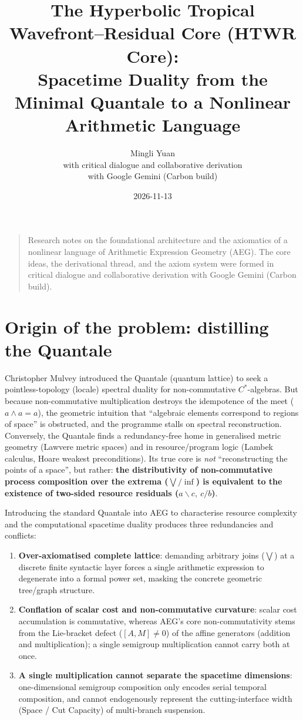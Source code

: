 \documentclass[11pt,a4paper]{article}
\title{\textbf{The Hyperbolic Tropical Wavefront--Residual Core (HTWR Core):}\\[0.3em]
Spacetime Duality from the Minimal Quantale to a Nonlinear Arithmetic Language}
\author{Mingli Yuan\\ \small with critical dialogue and collaborative derivation\\ \small with Google Gemini (Carbon build)}
\date{2026-11-13}
\theoremstyle{definition}
\theoremstyle{remark}
\begin{document}
\maketitle

\begin{quote}\small
Research notes on the foundational architecture and the axiomatics of a
nonlinear language of Arithmetic Expression Geometry (AEG).  The core ideas,
the derivational thread, and the axiom system were formed in critical dialogue
and collaborative derivation with Google Gemini (Carbon build).
\end{quote}

\section{Origin of the problem: distilling the Quantale}

Christopher Mulvey introduced the Quantale (quantum lattice) to seek a
pointless-topology (locale) spectral duality for non-commutative $C^*$-algebras.
But because non-commutative multiplication destroys the idempotence of the meet
($a \wedge a = a$), the geometric intuition that ``algebraic elements correspond
to regions of space'' is obstructed, and the programme stalls on spectral
reconstruction.  Conversely, the Quantale finds a redundancy-free home in
generalised metric geometry (Lawvere metric spaces) and in resource/program logic
(Lambek calculus, Hoare weakest preconditions).  Its true core is \emph{not}
``reconstructing the points of a space'', but rather: \textbf{the distributivity
of non-commutative process composition over the extrema ($\bigvee/\inf$) is
equivalent to the existence of two-sided resource residuals ($a \backslash c,\
c / b$)}.

Introducing the standard Quantale into AEG to characterise resource complexity
and the computational spacetime duality produces three redundancies and
conflicts:

\begin{enumerate}
\item \textbf{Over-axiomatised complete lattice}: demanding arbitrary joins
($\bigvee$) at a discrete finite syntactic layer forces a single arithmetic
expression to degenerate into a formal power set, masking the concrete geometric
tree/graph structure.
\item \textbf{Conflation of scalar cost and non-commutative curvature}: scalar
cost accumulation is commutative, whereas AEG's core non-commutativity stems from
the Lie-bracket defect ($[A, M] \neq 0$) of the affine generators (addition and
multiplication); a single semigroup multiplication cannot carry both at once.
\item \textbf{A single multiplication cannot separate the spacetime dimensions}:
one-dimensional semigroup composition only encodes serial temporal composition,
and cannot endogenously represent the cutting-interface width (Space / Cut
Capacity) of multi-branch suspension.
\end{enumerate}
\end{document}
